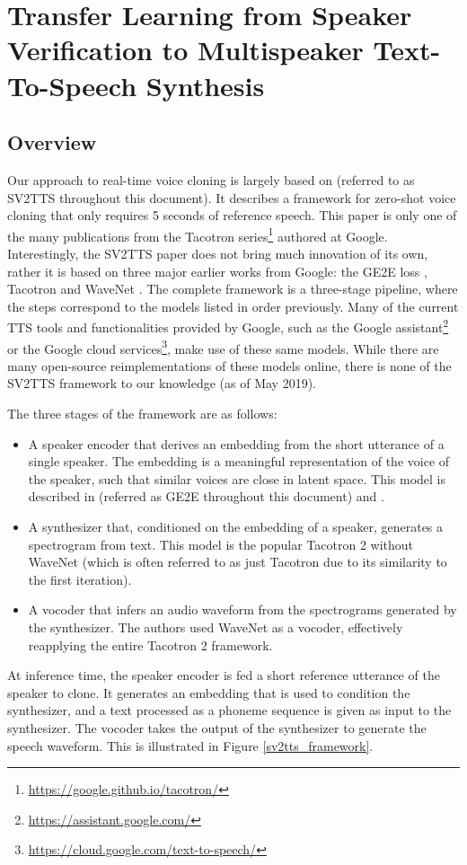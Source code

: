 \documentclass[a4paper, oneside, 12pt, english]{article}
\begin{document}
\section{Transfer Learning from Speaker Verification to Multispeaker Text-To-Speech Synthesis}
\subsection{Overview}
Our approach to real-time voice cloning is largely based on \citep{SV2TTS} (referred to as SV2TTS throughout this document). It describes a framework for zero-shot voice cloning that only requires 5 seconds of reference speech. This paper is only one of the many publications from the Tacotron series\footnote{\url{https://google.github.io/tacotron/}} authored at Google. Interestingly, the SV2TTS paper does not bring much innovation of its own, rather it is based on three major earlier works from Google: the GE2E loss \citep{GE2E}, Tacotron \citep{Tacotron1} and WaveNet \citep{WaveNet}. The complete framework is a three-stage pipeline, where the steps correspond to the models listed in order previously. Many of the current TTS tools and functionalities provided by Google, such as the Google assistant\footnote{\url{https://assistant.google.com/}} or the Google cloud services\footnote{\url{https://cloud.google.com/text-to-speech/}}, make use of these same models. While there are many open-source reimplementations of these models online, there is none of the SV2TTS framework to our knowledge (as of May 2019).

The three stages of the framework are as follows:
\begin{itemize}
	\item A speaker encoder that derives an embedding from the short utterance of a single speaker. The embedding is a meaningful representation of the voice of the speaker, such that similar voices are close in latent space. This model is described in \citep{GE2E} (referred as GE2E throughout this document) and \citep{TE2E}.
	\item A synthesizer that, conditioned on the embedding of a speaker, generates a spectrogram from text. This model is the popular Tacotron 2 \citep{Tacotron2} without WaveNet (which is often referred to as just Tacotron due to its similarity to the first iteration).
	\item A vocoder that infers an audio waveform from the spectrograms generated by the synthesizer. The authors used WaveNet \citep{WaveNet} as a vocoder, effectively reapplying the entire Tacotron 2 framework.
\end{itemize}
At inference time, the speaker encoder is fed a short reference utterance of the speaker to clone. It generates an embedding that is used to condition the synthesizer, and a text processed as a phoneme sequence is given as input to the synthesizer. The vocoder takes the output of the synthesizer to generate the speech waveform. This is illustrated in Figure \ref{sv2tts_framework}.
\end{document}
